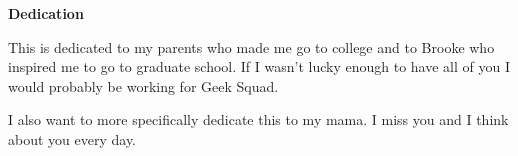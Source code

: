 {}
\begin{doublespace}
  \begin{center}
    \textbf{Dedication}
  \end{center}
This is dedicated to my parents who made me go to college and to Brooke who inspired me to go to graduate school.  If I wasn't lucky enough to have all of you I would probably be working for Geek Squad.
  
I also want to more specifically dedicate this to my mama.  I miss you and I think about you every day.
\end{doublespace}